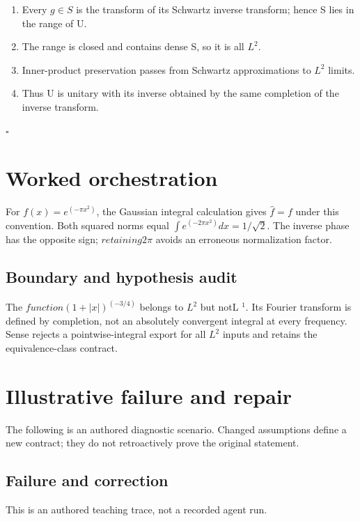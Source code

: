 \documentclass[preprint,12pt,aps,pra,showkeys,amsmath,amssymb,superscriptaddress,floatfix]{revtex4-2}
\theoremstyle{definition}
\theoremstyle{remark}
\begin{document}
\begin{enumerate}
\def\labelenumi{\arabic{enumi}.}
\item
  Every \(g\in S\) is the transform of its Schwartz inverse transform;
  hence S lies in the range of U.
\item
  The range is closed and contains dense S, so it is all \(L^{2}\).
\item
  Inner-product preservation passes from Schwartz approximations to
  \(L^{2}\) limits.
\item
  Thus U is unitary with its inverse obtained by the same completion of
  the inverse transform.
\end{enumerate}

\hfill$\square$

\section{Worked orchestration}

For \(f(x)=e^{(-\pi x^{2})}\), the Gaussian integral calculation gives
\(\widehat f=f\) under this convention. Both squared norms equal
\(\int e^{(-2\pi x^{2})}dx=1/\sqrt{2}\). The inverse phase has the
opposite sign; \(retaining2\pi\) avoids an erroneous normalization
factor.

\subsection{Boundary and hypothesis audit}

The \(function(1+|x|)^{(-3/4)}\) belongs to \(L^{2}\) but notL \(^{1}\).
Its Fourier transform is defined by completion, not an absolutely
convergent integral at every frequency. Sense rejects a
pointwise-integral export for all \(L^{2}\) inputs and retains the
equivalence-class contract.

\section{Illustrative failure and repair}

The following is an authored diagnostic scenario. Changed assumptions
define a new contract; they do not retroactively prove the original
statement.

\subsection{Failure and correction}
This is an authored teaching trace, not a recorded agent run.
\end{document}
